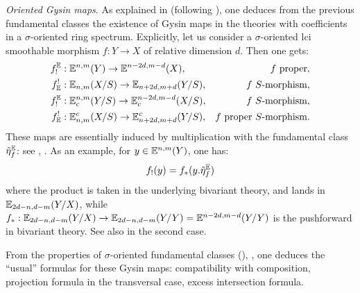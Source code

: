\begin{num}\textit{Oriented Gysin maps}.\label{num:general_Gysin}
 As explained in \cite[]{DJK} (following \cite{FMP}),
 one deduces from the previous fundamental classes the existence of Gysin maps in the theories with coefficients
 in a $\sigma$-oriented ring spectrum.
 Explicitly, let us consider a $\sigma$-oriented lci smoothable morphism $f:Y \rightarrow X$ of relative dimension $d$.
 Then one gets:
\begin{align*}
f_!^\mathbb E&:\mathbb E^{n,m}(Y) \rightarrow \mathbb E^{n-2d,m-d}(X), &f \text{ proper}, \\
f^!_\mathbb E&:\mathbb E_{n,m}(X/S) \rightarrow \mathbb E_{n+2d,m+d}(Y/S), &f \text{ $S$-morphism}, \\
f_!^\mathbb E&:\mathbb E^{n,m}_c(Y/S) \rightarrow \mathbb E^{n-2d,m-d}_c(X/S), &f \text{ $S$-morphism}, \\
f^!_\mathbb E&:\mathbb E_{n,m}^c(X/S) \rightarrow \mathbb E_{n+2d,m+d}^c(Y/S), &f \text{ proper $S$-morphism}.
\end{align*}
These maps are essentially induced by multiplication with the fundamental class $\tilde \eta_f^\mathbb E$:
 see \cite[3.3.2]{Deg16}, \cite[2.4.1]{DJK}.
 As an example, for $y \in \mathbb E^{n,m}(Y)$, one has:
$$
f_!(y)=f_*(y.\tilde\eta_f^\mathbb E)
$$
where the product is taken in the underlying bivariant theory,
 and lands in $\mathbb E_{2d-n,d-m}(Y/X)$, while
 $f_*:\mathbb E_{2d-n,d-m}(Y/X) \rightarrow \mathbb E_{2d-n,d-m}(Y/Y)=\mathbb E^{n-2d,m-d}(Y/Y)$
 is the pushforward in bivariant theory. See also \cite[2.4.1]{DJK} in the second case.
\end{num}

\begin{rem}
From the properties of $\sigma$-oriented fundamental classes (), ,
 one deduces the ``usual'' formulas for these Gysin maps: compatibility with composition,
 projection formula in the transversal case, excess intersection formula.
\end{rem}

